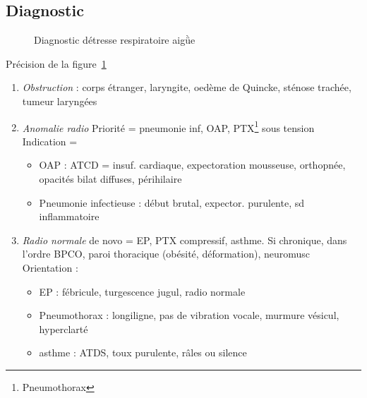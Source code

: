 \subsection{Diagnostic}

\begin{figure}[htpb]
  \centering
  \caption{Diagnostic détresse respiratoire aigǜe}
  \label{fig:diag_detresse_respi}
\end{figure}

Précision de la figure~\ref{fig:diag_detresse_respi}
\begin{enumerate}
\item \textit{Obstruction}  : corps étranger, laryngite, oedème de Quincke, sténose
  trachée, tumeur laryngées
\item \textit{Anomalie radio} Priorité = pneumonie inf, OAP,
  PTX\footnote{Pneumothorax} sous
  tension\\
  Indication =
  \begin{itemize}
  \item OAP : {ATCD = insuf. cardiaque}, {expectoration mousseuse, orthopnée},
    {opacités bilat diffuses, périhilaire}
  \item Pneumonie infectieuse : {début brutal}, {expector. purulente}, {sd
      inflammatoire}
  \end{itemize}
\item \textit{Radio normale} de novo = EP, PTX compressif, asthme. Si
  chronique, dans l'ordre BPCO, paroi thoracique (obésité, déformation),
  neuromusc\\
  Orientation :
  \begin{itemize}
  \item EP : fébricule, turgescence jugul, radio normale
  \item Pneumothorax : {longiligne}, {pas de vibration vocale}, murmure vésicul,
    {hyperclarté}
  \item asthme : ATDS, toux purulente, râles ou silence
  \end{itemize}
\end{enumerate}

